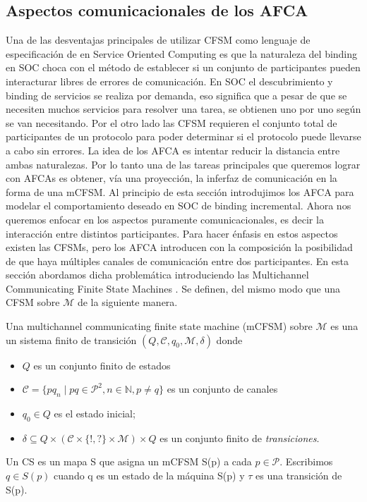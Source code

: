 \subsection{Aspectos comunicacionales de los AFCA}
Una de las desventajas principales de utilizar CFSM como lenguaje de especificación de en Service Oriented Computing es que la naturaleza del binding en SOC choca con el método de establecer si un conjunto de participantes pueden interacturar libres de errores de comunicación. En SOC el descubrimiento y binding de servicios se realiza por demanda, eso significa que a pesar de que se necesiten muchos servicios para resolver una tarea, se obtienen uno por uno según se van necesitando. Por el otro lado las CFSM requieren el conjunto total de participantes de un protocolo para poder determinar si el protocolo puede llevarse a cabo sin errores. La idea de los AFCA es intentar reducir la distancia entre ambas naturalezas. Por lo tanto una de las tareas principales que queremos lograr con AFCAs es obtener, vía una proyección, la inferfaz de comunicación en la forma de una mCFSM.
Al principio de esta sección introdujimos los AFCA para modelar el comportamiento deseado en SOC de binding incremental. Ahora nos queremos enfocar en los aspectos puramente comunicacionales, es decir la interacción entre distintos participantes. Para hacer énfasis en estos aspectos existen las CFSMs, pero los AFCA introducen con la composición la posibilidad de que haya múltiples canales de comunicación entre dos participantes. En esta sección abordamos dicha problemática introduciendo las Multichannel Communicating Finite State Machines \cite[Def.~82]{vissani:phdthesis}. Se definen, del mismo modo que una CFSM sobre $\mathcal{M}$ de la siguiente manera.

\begin{definition} Una multichannel communicating finite state machine (mCFSM) sobre $\mathcal{M}$ es una un sistema finito de transición $(Q, \mathcal{C}, q_0, \mathcal{M}, \delta)$ donde
\begin{itemize}
  \item $Q$ es un conjunto finito de estados
  \item $\mathcal{C} = \{ pq_n \mid pq \in \mathcal{P}^2, n \in \mathbb{N}, p \not= q\}$ es un conjunto de canales
  \item $q_0 \in Q$ es el estado inicial;
  \item $\delta \subseteq Q \times (\mathcal{C} \times \{!,?\} \times \mathcal{M}) \times
    Q$ es un conjunto finito de \emph{transiciones}.
  \end{itemize}

Un CS es un mapa S que asigna un mCFSM S(p) a cada $p \in \mathcal{P}$. Escribimos $q \in S(p)$ cuando q es un estado de la máquina S(p) y $\tau$ es una transición de S(p).\end{definition}

